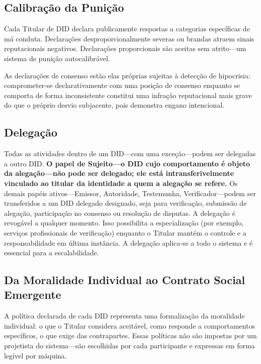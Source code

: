 \documentclass[11pt,a4paper,twocolumn]{article}
\begin{document}
\subsection{Calibração da Punição}

Cada Titular de DID declara publicamente respostas a categorias específicas de má conduta. Declarações desproporcionalmente severas ou brandas atraem sinais reputacionais negativos. Declarações proporcionais são aceitas sem atrito---um sistema de punição autocalibrável.

As declarações de consenso estão elas próprias sujeitas à detecção de hipocrisia: comprometer-se declarativamente com uma posição de consenso enquanto se comporta de forma inconsistente constitui uma infração reputacional mais grave do que o próprio desvio subjacente, pois demonstra engano intencional.

\subsection{Delegação}

Todas as atividades dentro de um DID---com uma exceção---podem ser delegadas a outro DID. \textbf{O papel de Sujeito---o DID cujo comportamento é objeto da alegação---não pode ser delegado; ele está intransferivelmente vinculado ao titular da identidade a quem a alegação se refere.} Os demais papéis ativos---Emissor, Autoridade, Testemunha, Verificador---podem ser transferidos a um DID delegado designado, seja para verificação, submissão de alegação, participação no consenso ou resolução de disputas. A delegação é revogável a qualquer momento. Isso possibilita a especialização (por exemplo, serviços profissionais de verificação) enquanto o Titular mantém o controle e a responsabilidade em última instância. A delegação aplica-se a todo o sistema e é essencial para a escalabilidade.

\subsection{Da Moralidade Individual ao Contrato Social Emergente}

A política declarada de cada DID representa uma formalização da moralidade individual: o que o Titular considera aceitável, como responde a comportamentos específicos, o que exige das contrapartes. Essas políticas não são impostas por um projetista do sistema---são escolhidas por cada participante e expressas em forma legível por máquina.
\end{document}
